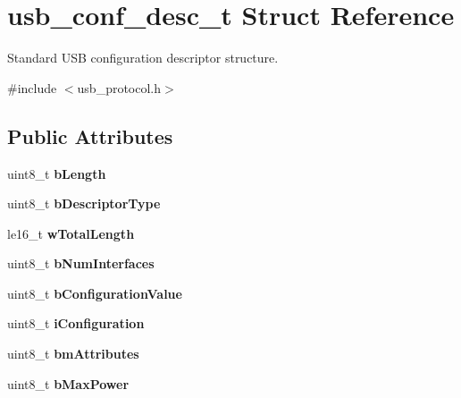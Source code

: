 \hypertarget{structusb__conf__desc__t}{\section{usb\-\_\-conf\-\_\-desc\-\_\-t Struct Reference}
\label{structusb__conf__desc__t}
}


Standard U\-S\-B configuration descriptor structure.  




{\ttfamily \#include $<$usb\-\_\-protocol.\-h$>$}

\subsection*{Public Attributes}
\begin{DoxyCompactItemize}
\item 
\hypertarget{structusb__conf__desc__t_acd480c332f94a519f5fe6f947801aa21}{uint8\-\_\-t {\bfseries b\-Length}}\label{structusb__conf__desc__t_acd480c332f94a519f5fe6f947801aa21}

\item 
\hypertarget{structusb__conf__desc__t_a0fa7aed7ce2f5284a7d7118e96248076}{uint8\-\_\-t {\bfseries b\-Descriptor\-Type}}\label{structusb__conf__desc__t_a0fa7aed7ce2f5284a7d7118e96248076}

\item 
\hypertarget{structusb__conf__desc__t_afa2ba7e6e481d99b0dd4c40744efc5bb}{le16\-\_\-t {\bfseries w\-Total\-Length}}\label{structusb__conf__desc__t_afa2ba7e6e481d99b0dd4c40744efc5bb}

\item 
\hypertarget{structusb__conf__desc__t_a445aa9404b196af184c74d3f8dfe691f}{uint8\-\_\-t {\bfseries b\-Num\-Interfaces}}\label{structusb__conf__desc__t_a445aa9404b196af184c74d3f8dfe691f}

\item 
\hypertarget{structusb__conf__desc__t_a74bb8bfa73467043c5135ed02381e291}{uint8\-\_\-t {\bfseries b\-Configuration\-Value}}\label{structusb__conf__desc__t_a74bb8bfa73467043c5135ed02381e291}

\item 
\hypertarget{structusb__conf__desc__t_a87ae189b300bdce2b61e690797218e79}{uint8\-\_\-t {\bfseries i\-Configuration}}\label{structusb__conf__desc__t_a87ae189b300bdce2b61e690797218e79}

\item 
\hypertarget{structusb__conf__desc__t_a46f189582cb2ccdd46ded73ebd518d74}{uint8\-\_\-t {\bfseries bm\-Attributes}}\label{structusb__conf__desc__t_a46f189582cb2ccdd46ded73ebd518d74}

\item 
\hypertarget{structusb__conf__desc__t_aa514d0a8b697cc3035bbaea8553638ec}{uint8\-\_\-t {\bfseries b\-Max\-Power}}\label{structusb__conf__desc__t_aa514d0a8b697cc3035bbaea8553638ec}

\end{DoxyCompactItemize}


